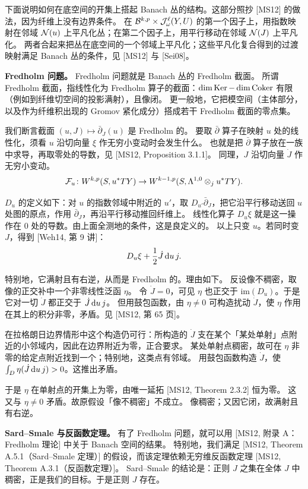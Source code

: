 
下面说明如何在底空间的开集上搭起 Banach 丛的结构。这部分照抄 [MS12] 的做法，因为纤维上没有边界条件。
在 $\mathcal{B}^{k,p}\times\mathcal{J}^\ell_\omega(Y,U)$ 的第一个因子上，用指数映射在邻域 $\mathcal{N}(u)$ 上平凡化丛；在第二个因子上，用平行移动在邻域 $\mathcal{N}(J)$ 上平凡化。
两者合起来把丛在底空间的一个邻域上平凡化；这些平凡化复合得到的过渡映射满足 Banach 丛的条件，见 [MS12] 与 [Sei08]。

\textbf{Fredholm 问题。}
Fredholm 问题就是 Banach 丛的 Fredholm 截面。
所谓 Fredholm 截面，指线性化为 Fredholm 算子的截面：$\dim\operatorname{Ker}-\dim\operatorname{Coker}$ 有限（例如到纤维切空间的投影满射），且像闭。
更一般地，它把模空间（主体部分，以及作为纤维积出现的 Gromov 紧化成分）搭成若干 Fredholm 截面的零点集。

我们断言截面 $(u,J)\mapsto\bar\partial_J(u)$ 是 Fredholm 的。
要取 $\bar\partial$ 算子在映射 $u$ 处的线性化，须看 $u$ 沿切向量 $\xi$ 作无穷小变动时会发生什么。
也就是把 $\bar\partial$ 算子放在一族中求导，再取零处的导数，见 [MS12, Proposition 3.1.1]。
同理，$J$ 沿切向量 $\dot J$ 作无穷小变动。
\[
\mathcal{F}_u\colon W^{k,p}(S,u^*TY)\to W^{k-1,p}(S,\Lambda^{1,0}\otimes_j u^*TY).
\]

$D_u$ 的定义如下：对 $u$ 的指数邻域中附近的 $u'$，取 $D_{u'}\bar\partial_J$，把它沿平行移动送回 $u$ 处图的原点，作用 $\bar\partial_J$，再沿平行移动推回纤维上。
线性化算子 $D_u\xi$ 就是这一操作在 $0$ 处的导数。由上面全测地的条件，这是良定义的。
以上只变 $u$。若同时变 $J$，得到 [Weh14, 第 9 讲]：
\[
D_u\xi+\frac12\dot J\,\mathrm{d} u\,j .
\]

特别地，它满射且有右逆，从而是 Fredholm 的。理由如下。
反设像不稠密，取像的正交补中一个非零线性泛函 $\eta$。
令 $\dot J=0$，可见 $\eta$ 也正交于 $\mathrm{im}(D_u)$。于是它对一切 $\dot J$ 都正交于 $\dot J\,\mathrm{d} u\,j$。
但用鼓包函数，由 $\eta\neq0$ 可构造扰动 $\dot J$，使 $\eta$ 作用在其上的积分非零，矛盾。见 [MS12, 第 65 页]。

在拉格朗日边界情形中这个构造仍可行：所构造的 $\dot J$ 支在某个「某处单射」点附近的小邻域内，因此在边界附近为零，正合要求。
某处单射点稠密，故可在 $\eta$ 非零的给定点附近找到一个；特别地，这类点有邻域。
用鼓包函数构造 $\dot J$，使 $\int_D\eta(\dot J\,\mathrm{d} u\,j)>0$。这推出矛盾。


于是 $\eta$ 在单射点的开集上为零，由唯一延拓 [MS12, Theorem 2.3.2] 恒为零。
这又与 $\eta\neq0$ 矛盾。故原假设「像不稠密」不成立。
像稠密；又因它闭，故满射且有右逆。

\textbf{Sard--Smale 与反函数定理。}
有了 Fredholm 问题，就可以用 [MS12, 附录 A：Fredholm 理论] 中关于 Banach 空间的结果。
特别地，我们满足 [MS12, Theorem A.5.1（Sard--Smale 定理）] 的假设，而该定理依赖无穷维反函数定理 [MS12, Theorem A.3.1（反函数定理）]。
Sard--Smale 的结论是：正则 $J$ 之集在全体 $J$ 中稠密，正是我们的目标。于是正则 $J$ 存在。

